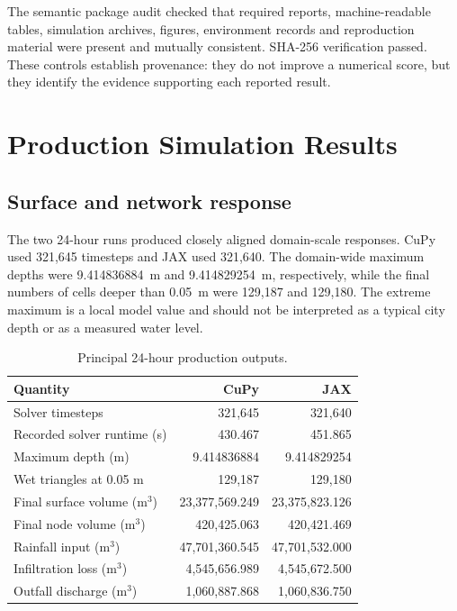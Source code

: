\documentclass[11pt,a4paper,oneside]{report}
\begin{document}
The semantic package audit checked that required reports, machine-readable tables, simulation
archives, figures, environment records and reproduction material were present and mutually
consistent. SHA-256 verification passed. These controls establish provenance: they do not improve
a numerical score, but they identify the evidence supporting each reported result.

\chapter{Production Simulation Results}\label{chap:results}
\section{Surface and network response}
The two 24-hour runs produced closely aligned domain-scale responses. CuPy used 321,645
timesteps and JAX used 321,640. The domain-wide maximum depths were
\SI{9.414836884}{\metre} and \SI{9.414829254}{\metre}, respectively, while the final numbers
of cells deeper than \SI{0.05}{\metre} were 129,187 and 129,180. The extreme maximum is a
local model value and should not be interpreted as a typical city depth or as a measured
water level.

\begin{table}[H]
\centering
\caption[Principal 24-hour production outputs.]{Principal 24-hour production outputs.}
\label{tab:production}
\small
\begin{tabular}{|l|r|r|}
\hline
\textbf{Quantity} & \textbf{CuPy} & \textbf{JAX} \\
\hline\hline
Solver timesteps & 321,645 & 321,640 \\ \hdashline[0.4pt/1.2pt]
Recorded solver runtime (s) & 430.467 & 451.865 \\ \hdashline[0.4pt/1.2pt]
Maximum depth (m) & 9.414836884 & 9.414829254 \\ \hdashline[0.4pt/1.2pt]
Wet triangles at 0.05 m & 129,187 & 129,180 \\ \hdashline[0.4pt/1.2pt]
Final surface volume (m$^3$) & 23,377,569.249 & 23,375,823.126 \\ \hdashline[0.4pt/1.2pt]
Final node volume (m$^3$) & 420,425.063 & 420,421.469 \\ \hdashline[0.4pt/1.2pt]
Rainfall input (m$^3$) & 47,701,360.545 & 47,701,532.000 \\ \hdashline[0.4pt/1.2pt]
Infiltration loss (m$^3$) & 4,545,656.989 & 4,545,672.500 \\ \hdashline[0.4pt/1.2pt]
Outfall discharge (m$^3$) & 1,060,887.868 & 1,060,836.750 \\
\hline
\end{tabular}
\end{table}
\end{document}
